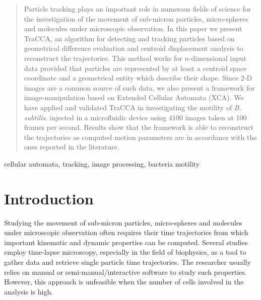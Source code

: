\documentclass[conference]{IEEEtran}
\begin{document}
\maketitle


\begin{abstract}
Particle tracking plays an important role in numerous fields of science for the investigation of the movement of sub-micron particles, micro-spheres and molecules under microscopic observation.
In this paper we present TraCCA, an algorithm for detecting and tracking particles based on geometrical difference evaluation and centroid displacement analysis to reconstruct the trajectories. 
This method works for $n$-dimensional input data provided that particles are represented by at least a centroid space coordinate and a geometrical entity which describe their shape. 
Since 2-D images are a common source of such data, we also present a framework for image-manipulation based on Extended Cellular Automata (XCA).
We have applied and validated TraCCA in investigating the motility of \textit{B. subtilis.} injected in a microfluidic device using 4100 images taken at 100 frames per second. 
Results show that the framework is able to reconstruct the trajectories as computed motion parameters  are in accordance with the ones reported in the literature.   


\end{abstract}

\begin{IEEEkeywords}
cellular automata, tracking, image processing, bacteria motility
\end{IEEEkeywords}






%
\IEEEpeerreviewmaketitle

\section{Introduction}
Studying the movement of sub-micron particles, micro-spheres and molecules under microscopic observation often requires their time trajectories from which important kinematic and dynamic properties can be computed. 
Several studies employ time-lapse microscopy, especially in the field of biophysics, as a tool to gather data and retrieve single particle time trajectories. The researcher usually relies on manual or semi-manual/interactive software to study such properties. However, this approach is unfeasible when the number of cells involved in the analysis is high.
\end{document}
